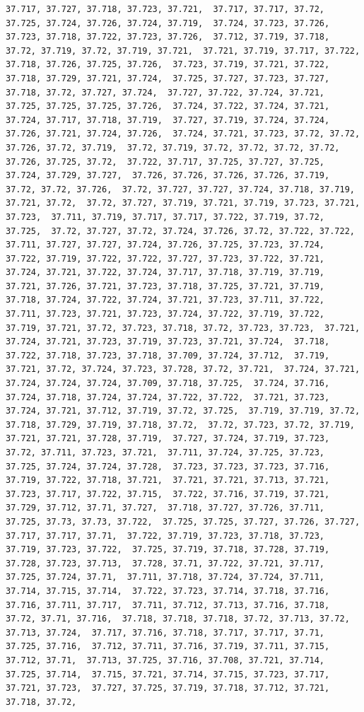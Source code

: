 \documentclass[
]{article}
\begin{document}
\begin{verbatim}
37.717, 37.727, 37.718, 37.723, 37.721,  37.717, 37.717, 37.72, 37.725, 37.724, 37.726, 37.724, 37.719,  37.724, 37.723, 37.726, 37.723, 37.718, 37.722, 37.723, 37.726,  37.712, 37.719, 37.718, 37.72, 37.719, 37.72, 37.719, 37.721,  37.721, 37.719, 37.717, 37.722, 37.718, 37.726, 37.725, 37.726,  37.723, 37.719, 37.721, 37.722, 37.718, 37.729, 37.721, 37.724,  37.725, 37.727, 37.723, 37.727, 37.718, 37.72, 37.727, 37.724,  37.727, 37.722, 37.724, 37.721, 37.725, 37.725, 37.725, 37.726,  37.724, 37.722, 37.724, 37.721, 37.724, 37.717, 37.718, 37.719,  37.727, 37.719, 37.724, 37.724, 37.726, 37.721, 37.724, 37.726,  37.724, 37.721, 37.723, 37.72, 37.72, 37.726, 37.72, 37.719,  37.72, 37.719, 37.72, 37.72, 37.72, 37.72, 37.726, 37.725, 37.72,  37.722, 37.717, 37.725, 37.727, 37.725, 37.724, 37.729, 37.727,  37.726, 37.726, 37.726, 37.726, 37.719, 37.72, 37.72, 37.726,  37.72, 37.727, 37.727, 37.724, 37.718, 37.719, 37.721, 37.72,  37.72, 37.727, 37.719, 37.721, 37.719, 37.723, 37.721, 37.723,  37.711, 37.719, 37.717, 37.717, 37.722, 37.719, 37.72, 37.725,  37.72, 37.727, 37.72, 37.724, 37.726, 37.72, 37.722, 37.722,  37.711, 37.727, 37.727, 37.724, 37.726, 37.725, 37.723, 37.724,  37.722, 37.719, 37.722, 37.722, 37.727, 37.723, 37.722, 37.721,  37.724, 37.721, 37.722, 37.724, 37.717, 37.718, 37.719, 37.719,  37.721, 37.726, 37.721, 37.723, 37.718, 37.725, 37.721, 37.719,  37.718, 37.724, 37.722, 37.724, 37.721, 37.723, 37.711, 37.722,  37.711, 37.723, 37.721, 37.723, 37.724, 37.722, 37.719, 37.722,  37.719, 37.721, 37.72, 37.723, 37.718, 37.72, 37.723, 37.723,  37.721, 37.724, 37.721, 37.723, 37.719, 37.723, 37.721, 37.724,  37.718, 37.722, 37.718, 37.723, 37.718, 37.709, 37.724, 37.712,  37.719, 37.721, 37.72, 37.724, 37.723, 37.728, 37.72, 37.721,  37.724, 37.721, 37.724, 37.724, 37.724, 37.709, 37.718, 37.725,  37.724, 37.716, 37.724, 37.718, 37.724, 37.724, 37.722, 37.722,  37.721, 37.723, 37.724, 37.721, 37.712, 37.719, 37.72, 37.725,  37.719, 37.719, 37.72, 37.718, 37.729, 37.719, 37.718, 37.72,  37.72, 37.723, 37.72, 37.719, 37.721, 37.721, 37.728, 37.719,  37.727, 37.724, 37.719, 37.723, 37.72, 37.711, 37.723, 37.721,  37.711, 37.724, 37.725, 37.723, 37.725, 37.724, 37.724, 37.728,  37.723, 37.723, 37.723, 37.716, 37.719, 37.722, 37.718, 37.721,  37.721, 37.721, 37.713, 37.721, 37.723, 37.717, 37.722, 37.715,  37.722, 37.716, 37.719, 37.721, 37.729, 37.712, 37.71, 37.727,  37.718, 37.727, 37.726, 37.711, 37.725, 37.73, 37.73, 37.722,  37.725, 37.725, 37.727, 37.726, 37.727, 37.717, 37.717, 37.71,  37.722, 37.719, 37.723, 37.718, 37.723, 37.719, 37.723, 37.722,  37.725, 37.719, 37.718, 37.728, 37.719, 37.728, 37.723, 37.713,  37.728, 37.71, 37.722, 37.721, 37.717, 37.725, 37.724, 37.71,  37.711, 37.718, 37.724, 37.724, 37.711, 37.714, 37.715, 37.714,  37.722, 37.723, 37.714, 37.718, 37.716, 37.716, 37.711, 37.717,  37.711, 37.712, 37.713, 37.716, 37.718, 37.72, 37.71, 37.716,  37.718, 37.718, 37.718, 37.72, 37.713, 37.72, 37.713, 37.724,  37.717, 37.716, 37.718, 37.717, 37.717, 37.71, 37.725, 37.716,  37.712, 37.711, 37.716, 37.719, 37.711, 37.715, 37.712, 37.71,  37.713, 37.725, 37.716, 37.708, 37.721, 37.714, 37.725, 37.714,  37.715, 37.721, 37.714, 37.715, 37.723, 37.717, 37.721, 37.723,  37.727, 37.725, 37.719, 37.718, 37.712, 37.721, 37.718, 37.72,  
\end{verbatim}
\end{document}
